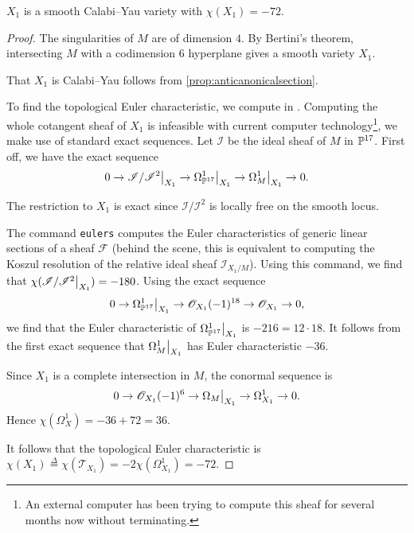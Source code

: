 \begin{proposition}
\label{prop:x1}
$X_1$ is a smooth Calabi--Yau variety with $\chi(X_1)=-72$.
\end{proposition}
\begin{proof}
The singularities of $M$ are of dimension $4$. By Bertini's theorem, intersecting $M$ with a codimension $6$ hyperplane gives a smooth variety $X_1$.

That $X_1$ is Calabi--Yau follows from \cref{prop:anticanonicalsection}.

To find the topological Euler characteristic, we compute in \MM. Computing the whole cotangent sheaf of $X_1$ is infeasible with current computer technology\footnote{An external computer has been trying to compute this sheaf for several months now without terminating.}, we make use of standard exact sequences. Let $\mathscr I$ be the ideal sheaf of $M$ in $\P^{17}$. First off, we have the exact sequence
$$
0 \to \restr{\mathscr I/\mathscr I^2}{X_1} \to \restr{\Omega_{\P^{17}}^1}{X_1} \to \restr{\Omega_M^1}{X_1} \to 0.
$$

The restriction to ${X_1}$ is exact since $\mathscr I/\mathscr I^2$ is locally free on the smooth locus.

The \MM command \texttt{eulers} computes the Euler characteristics of generic linear sections of a sheaf $\mathscr F$ (behind the scene, this is equivalent to computing the Koszul resolution of the relative ideal sheaf $\mathscr I_{X_1/M}$). Using this command, we find that $\chi(\restr{\mathscr I/\mathscr I^2}{X_1})=-180$. Using the exact sequence
$$
0 \to \restr{\Omega_{\P^{17}}^1}{X_1} \to \OO_{X_1}(-1)^{18} \to \OO_{X_1} \to 0,
$$
we find that the Euler characteristic of $\restr{\Omega_{\P^{17}}^1}{X_1}$ is $-216=12\cdot 18$. It follows from the first exact sequence that $\restr{\Omega_M^1}{X_1}$ has Euler characteristic $-36$.

Since $X_1$ is a complete intersection in $M$, the conormal sequence is
$$
0 \to \OO_{X_1}(-1)^6 \to \restr{\Omega_M}{X_1}  \to \Omega_{X_1}^1 \to 0.
$$
Hence $\chi(\Omega_X^1) = -36+72 = 36$.

It follows that the topological Euler characteristic is $\chi(X_1) \stackrel \Delta = \chi(\mathcal T_{X_1}) = -2\chi(\Omega_{X_1}^1)=-72$.
\end{proof}

